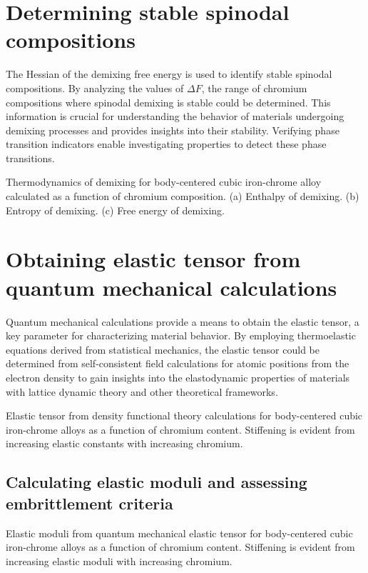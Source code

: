 \section{Determining stable spinodal compositions}
The Hessian of the demixing free energy is used to identify stable spinodal compositions. By analyzing the values of $\Delta F$, the range of chromium compositions where spinodal demixing is stable could be determined. This information is crucial for understanding the behavior of materials undergoing demixing processes and provides insights into their stability. Verifying phase transition indicators enable investigating properties to detect these phase transitions. 

Thermodynamics of demixing for body-centered cubic iron-chrome alloy calculated as a function of chromium composition. \cite{korzhavyi2009electronic,trochet2021influence,levesque2011simple, binder2001spinodal}(a) Enthalpy of demixing. (b) Entropy of demixing. (c) Free energy of demixing. 



\section{Obtaining elastic tensor from quantum mechanical calculations}
Quantum mechanical calculations provide a means to obtain the elastic tensor, a key parameter for characterizing material behavior. By employing thermoelastic equations derived from statistical mechanics, the elastic tensor could be determined from self-consistent field calculations for atomic positions from the electron density to gain insights into the elastodynamic properties of materials with lattice dynamic theory and other theoretical frameworks.

Elastic tensor from density functional theory calculations for body-centered cubic iron-chrome alloys as a function of chromium content. Stiffening is evident from increasing elastic constants with increasing chromium. \cite{korzhavyi2009electronic,razumovskiy2011first}

\subsection{Calculating elastic moduli and assessing embrittlement criteria}
Elastic moduli from quantum mechanical elastic tensor for body-centered cubic iron-chrome alloys as a function of chromium content. Stiffening is evident from increasing elastic moduli with increasing chromium. \cite{korzhavyi2009electronic,razumovskiy2011first}




